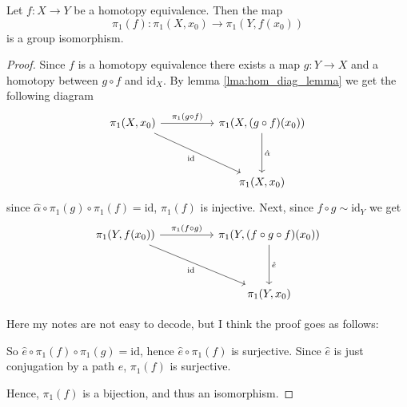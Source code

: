 \begin{theorem}
    Let \( f: X \to Y \) be a homotopy equivalence.
    Then the map \[
      \pi_1(f): \pi_1(X, x_0) \to \pi_1(Y, f(x_0))
    \]
    is a group isomorphism.
\end{theorem}

\begin{proof}
  Since \( f \) is a homotopy equivalence
  there exists a map \( g: Y \to X \)
  and a homotopy between
  \( g \circ f \) and \( \text{id}_X \).
  By lemma \ref{lma:hom_diag_lemma}
  we get the following diagram
  \[\begin{tikzcd}
    {\pi_1(X, x_0)} && {\pi_1(X, (g \circ f)(x_0))} \\
    \\
    && {\pi_1(X, x_0)}
    \arrow["{\pi_1(g \circ f)}", from=1-1, to=1-3]
    \arrow["{\text{id}}"', from=1-1, to=3-3]
    \arrow["{\hat{\alpha}}", from=1-3, to=3-3]
  \end{tikzcd}\]
  since \( \hat{\alpha} \circ \pi_1(g) \circ \pi_1(f) = \text{id}\),
  \( \pi_1(f) \) is injective.
  Next, since \( f \circ g \sim \text{id}_Y \)
  we get
    \[\begin{tikzcd}
      {\pi_1(Y, f(x_0))} && {\pi_1(Y, (f \circ g \circ f)(x_0))} \\
      \\
      && {\pi_1(Y, x_0)}
      \arrow["{\pi_1(f \circ g)}", from=1-1, to=1-3]
      \arrow["{\text{id}}"', from=1-1, to=3-3]
      \arrow["{\hat{e}}", from=1-3, to=3-3]
    \end{tikzcd}\]

    Here my notes are not easy to decode,
    but I think the proof goes as follows:

    So \( \hat{e} \circ \pi_1(f) \circ \pi_1(g) = \text{id} \),
    hence \( \hat{e} \circ \pi_1(f) \) is surjective.
    Since \( \hat{e} \) is just conjugation by a path
    \( e \), \( \pi_1(f) \) is surjective.

    Hence, \( \pi_1(f) \) is a bijection, 
    and thus an isomorphism.
\end{proof}

